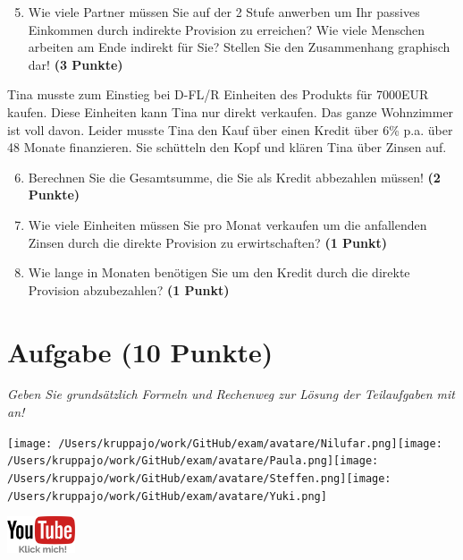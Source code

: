 \documentclass[a4paper, 9pt]{scrartcl}\usepackage[]{graphicx}\usepackage[]{xcolor}
\begin{document}
\begin{enumerate}
  \setcounter{enumi}{4}
\item Wie viele Partner müssen Sie auf der 2 Stufe anwerben um Ihr passives Einkommen durch indirekte Provision zu erreichen? Wie viele Menschen arbeiten am Ende indirekt für Sie? Stellen Sie den Zusammenhang graphisch dar!  \textbf{(3 Punkte)}
\end{enumerate}

Tina musste zum Einstieg bei D-FL/R Einheiten des Produkts für 7000EUR kaufen. Diese Einheiten kann Tina nur direkt verkaufen. Das ganze Wohnzimmer ist voll davon. Leider musste Tina den Kauf über einen Kredit über 6\% p.a. über 48 Monate finanzieren. Sie schütteln den Kopf und klären Tina über Zinsen auf.

\begin{enumerate}
  \setcounter{enumi}{5}
\item Berechnen Sie die Gesamtsumme, die Sie als Kredit abbezahlen müssen! \textbf{(2 Punkte)}
\item Wie viele Einheiten müssen Sie pro Monat verkaufen um die anfallenden Zinsen durch die direkte Provision zu erwirtschaften? \textbf{(1 Punkt)}
\item Wie lange in Monaten benötigen Sie um den Kredit durch die direkte Provision abzubezahlen? \textbf{(1 Punkt)}
\end{enumerate} 
\clearpage

\section{Aufgabe \hfill (10 Punkte)}

\textit{Geben Sie grundsätzlich Formeln und Rechenweg zur Lösung der Teilaufgaben mit an!} \\[1Ex]
 

 
\begin{minipage}[t]{0.5\textwidth}
\texttt{[image: /Users/kruppajo/work/GitHub/exam/avatare/Nilufar.png]}\hspace{-4mm}\texttt{[image: /Users/kruppajo/work/GitHub/exam/avatare/Paula.png]}\hspace{-4mm}\texttt{[image: /Users/kruppajo/work/GitHub/exam/avatare/Steffen.png]}\hspace{-4mm}\texttt{[image: /Users/kruppajo/work/GitHub/exam/avatare/Yuki.png]}
\end{minipage}
\begin{minipage}[t]{0.5\textwidth}
\hfill
\href{https://youtu.be/8Pb2sKUIMyk}{\includegraphics[width = 2cm]{img/youtube}}
\end{minipage}
\end{document}
